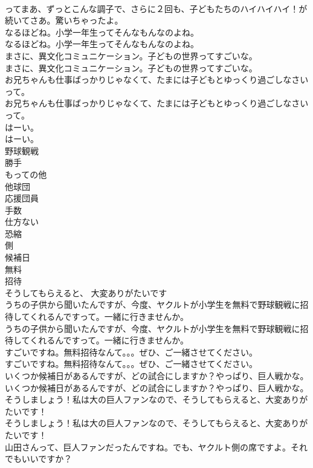 \documentclass[8pt]{extreport}
\begin{document}
\begin{CJK}{UTF8}{min}
\\	ってまあ、ずっとこんな調子で、さらに２回も、子どもたちのハイハイハイ！が続いてさあ。驚いちゃったよ。 
\\	なるほどね。小学一年生ってそんなもんなのよね。	
\\	なるほどね。小学一年生ってそんなもんなのよね。 
\\	まさに、異文化コミュニケーション。子どもの世界ってすごいな。	
\\	まさに、異文化コミュニケーション。子どもの世界ってすごいな。 
\\	お兄ちゃんも仕事ばっかりじゃなくて、たまには子どもとゆっくり過ごしなさいって。	
\\	お兄ちゃんも仕事ばっかりじゃなくて、たまには子どもとゆっくり過ごしなさいって。 
\\	はーい。	
\\	はーい。 
\\	野球観戦
\\	勝手
\\	もっての他
\\	他球団
\\	応援団員
\\	手数
\\	仕方ない
\\	恐縮
\\	側
\\	候補日
\\	無料
\\	招待
\\	そうしてもらえると、 大変ありがたいです
\\	うちの子供から聞いたんですが、今度、ヤクルトが小学生を無料で野球観戦に招待してくれるんですって。一緒に行きませんか。	
\\	うちの子供から聞いたんですが、今度、ヤクルトが小学生を無料で野球観戦に招待してくれるんですって。一緒に行きませんか。 
\\	すごいですね。無料招待なんて。。。ぜひ、ご一緒させてください。	
\\	すごいですね。無料招待なんて。。。ぜひ、ご一緒させてください。 
\\	いくつか候補日があるんですが、どの試合にしますか？やっぱり、巨人戦かな。	
\\	いくつか候補日があるんですが、どの試合にしますか？やっぱり、巨人戦かな。 
\\	そうしましょう！私は大の巨人ファンなので、そうしてもらえると、大変ありがたいです！	
\\	そうしましょう！私は大の巨人ファンなので、そうしてもらえると、大変ありがたいです！ 
\\	山田さんって、巨人ファンだったんですね。でも、ヤクルト側の席ですよ。それでもいいですか？	

\end{CJK}
\end{document}
